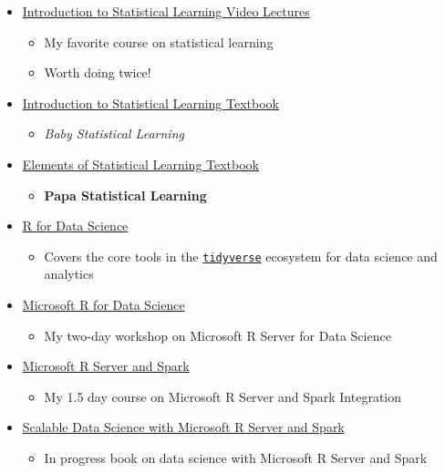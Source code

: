 \documentclass[]{book}
\providecommand{\tightlist}{%
  \setlength{\itemsep}{0pt}\setlength{\parskip}{0pt}}
\theoremstyle{definition}
\theoremstyle{definition}
\theoremstyle{definition}
\theoremstyle{remark}
\begin{document}
\begin{itemize}
\tightlist
\item
  \href{https://lagunita.stanford.edu/courses/HumanitiesSciences/StatLearning/Winter2016/about}{Introduction
  to Statistical Learning Video Lectures}

  \begin{itemize}
  \tightlist
  \item
    My favorite course on statistical learning
  \item
    Worth doing twice!
  \end{itemize}
\item
  \href{http://www-bcf.usc.edu/~gareth/ISL/}{Introduction to Statistical
  Learning Textbook}

  \begin{itemize}
  \tightlist
  \item
    \emph{Baby Statistical Learning}
  \end{itemize}
\item
  \href{http://statweb.stanford.edu/~tibs/ElemStatLearn/}{Elements of
  Statistical Learning Textbook}

  \begin{itemize}
  \tightlist
  \item
    \textbf{Papa Statistical Learning}
  \end{itemize}
\item
  \href{http://r4ds.had.co.nz/}{R for Data Science}

  \begin{itemize}
  \tightlist
  \item
    Covers the core tools in the
    \href{http://tidyverse.org/}{\texttt{tidyverse}} ecosystem for data
    science and analytics
  \end{itemize}
\item
  \href{https://github.com/Azure/LearnAnalytics-mr4ds}{Microsoft R for
  Data Science}

  \begin{itemize}
  \tightlist
  \item
    My two-day workshop on Microsoft R Server for Data Science
  \end{itemize}
\item
  \href{https://github.com/Azure/LearnAnalytics-mrs-spark}{Microsoft R
  Server and Spark}

  \begin{itemize}
  \tightlist
  \item
    My 1.5 day course on Microsoft R Server and Spark Integration
  \end{itemize}
\item
  \href{https://bookdown.org/alizaidi/mrs-spark-ml/}{Scalable Data
  Science with Microsoft R Server and Spark}

  \begin{itemize}
  \tightlist
  \item
    In progress book on data science with Microsoft R Server and Spark
  \end{itemize}
\end{itemize}
\end{document}
